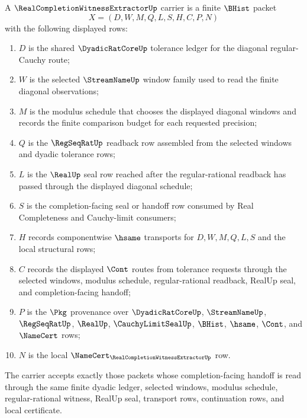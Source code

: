 \begin{definition}
\label{def:real-completion-witness-extractor-carrier}
A $\RealCompletionWitnessExtractorUp$ carrier is a finite $\BHist$ packet
$$
X=(D,W,M,Q,L,S,H,C,P,N)
$$
with the following displayed rows:
\begin{enumerate}
\item $D$ is the shared $\DyadicRatCoreUp$ tolerance ledger for the diagonal
regular-Cauchy route;
\item $W$ is the selected $\StreamNameUp$ window family used to read the
finite diagonal observations;
\item $M$ is the modulus schedule that chooses the displayed diagonal windows
and records the finite comparison budget for each requested precision;
\item $Q$ is the $\RegSeqRatUp$ readback row assembled from the selected
windows and dyadic tolerance rows;
\item $L$ is the $\RealUp$ seal row reached after the regular-rational
readback has passed through the displayed diagonal schedule;
\item $S$ is the completion-facing seal or handoff row consumed by Real
Completeness and Cauchy-limit consumers;
\item $H$ records componentwise $\hsame$ transports for $D,W,M,Q,L,S$ and the
local structural rows;
\item $C$ records the displayed $\Cont$ routes from tolerance requests through
the selected windows, modulus schedule, regular-rational readback, RealUp
seal, and completion-facing handoff;
\item $P$ is the $\Pkg$ provenance over $\DyadicRatCoreUp$, $\StreamNameUp$,
$\RegSeqRatUp$, $\RealUp$, $\CauchyLimitSealUp$, $\BHist$, $\hsame$, $\Cont$,
and $\NameCert$ rows;
\item $N$ is the local $\NameCert_{\RealCompletionWitnessExtractorUp}$ row.
\end{enumerate}
The carrier accepts exactly those packets whose completion-facing handoff is
read through the same finite dyadic ledger, selected windows, modulus schedule,
regular-rational witness, RealUp seal, transport rows, continuation rows, and
local certificate.
\end{definition}

